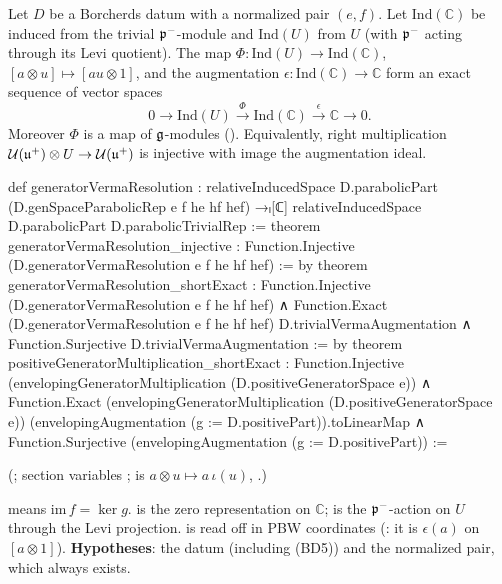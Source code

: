 \begin{theorem}\label{ch18:thm:resolution}
Let $D$ be a Borcherds datum with a normalized pair $(e,f)$.  Let $\mathrm{Ind}(\mathbb C)$ be induced from the trivial $\mathfrak{p}^-$-module and $\mathrm{Ind}(U)$
from $U$ (with $\mathfrak{p}^-$ acting through its Levi quotient).  The map $\Phi:\mathrm{Ind}(U)\to \mathrm{Ind}(\mathbb C)$, $[a\otimes u]\mapsto[au\otimes1]$, and the
augmentation $\epsilon:\mathrm{Ind}(\mathbb C)\to\mathbb C$ form an exact sequence of vector spaces
\begin{equation*}
  0\longrightarrow \mathrm{Ind}(U)\xrightarrow{\ \Phi\ }\mathrm{Ind}(\mathbb C)\xrightarrow{\ \epsilon\ }\mathbb C\longrightarrow0 .
\end{equation*}
Moreover $\Phi$ is a map of $\mathfrak{g}$-modules ().
Equivalently, right multiplication $\mathcal U(\mathfrak{u}^+)\otimes U\to \mathcal U(\mathfrak{u}^+)$ is injective with image the augmentation ideal.
\end{theorem}
\begin{leancode}
def generatorVermaResolution :
    relativeInducedSpace D.parabolicPart (D.genSpaceParabolicRep e f he hf hef) →ₗ[ℂ]
      relativeInducedSpace D.parabolicPart D.parabolicTrivialRep :=
theorem generatorVermaResolution_injective :
    Function.Injective (D.generatorVermaResolution e f he hf hef) := by
theorem generatorVermaResolution_shortExact :
    Function.Injective (D.generatorVermaResolution e f he hf hef) ∧
      Function.Exact (D.generatorVermaResolution e f he hf hef) D.trivialVermaAugmentation ∧
      Function.Surjective D.trivialVermaAugmentation := by
theorem positiveGeneratorMultiplication_shortExact :
    Function.Injective (envelopingGeneratorMultiplication (D.positiveGeneratorSpace e)) ∧
      Function.Exact (envelopingGeneratorMultiplication (D.positiveGeneratorSpace e))
        (envelopingAugmentation (g := D.positivePart)).toLinearMap ∧
      Function.Surjective (envelopingAugmentation (g := D.positivePart)) :=
\end{leancode}
(; section variables ;
 is $a\otimes u\mapsto a\,\iota(u)$, .)
\begin{dictionary}
 means $\mathrm{im}\,f=\ker g$.   is the zero representation on $\mathbb C$;
 is the $\mathfrak{p}^-$-action on $U$ through the Levi projection.
 is read off in PBW coordinates (: it is $\epsilon(a)$ on
$[a\otimes1]$).  \textbf{Hypotheses}: the datum (including (BD5)) and the normalized pair, which always exists.
\end{dictionary}
